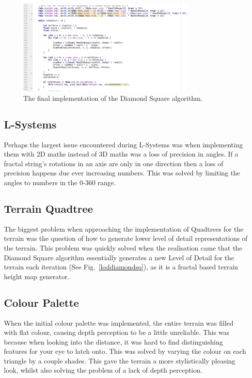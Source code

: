 \documentclass[a4paper,10pt]{report}
\begin{document}
\begin{figure}[h!]
    \centering
  \includegraphics[width=0.8\textwidth]{Images/Code-Snippets/DiamondSquareAlgorithm.png}
 \caption{The final implementation of the Diamond Square algorithm.}
 \label{fig:diamondsquareimpl}
\end{figure}

\subsection{L-Systems}

Perhaps the largest issue encountered during L-Systems was when implementing them with 2D maths instead of 3D maths was a loss of precision in angles. If a fractal string's rotations in an axis are only in  one direction then a loss of precision happens due ever increasing numbers. This was solved by limiting the angles to numbers in the 0-360 range.

\subsection{Terrain Quadtree}

The biggest problem when approaching the implementation of Quadtrees for the terrain was the question of how to generate lower level of detail representations of the terrain. This problem was quickly solved when the realisation came that the Diamond Square algorithm essentially generates a new Level of Detail for the terrain each iteration (See Fig.~\ref{loddiamondsq}), as it is a fractal based terrain height map generator. 

\subsection{Colour Palette}
When the initial colour palette was implemented, the entire terrain was filled with flat colour, causing depth perception to be a little unreliable. This was because when looking into the distance, it was hard to find distinguishing features for your eye to latch onto. This was solved by varying the colour on each triangle by a couple shades. This gave the terrain a more stylistically pleasing look, whilst also solving the problem of a lack of depth perception. 
\end{document}
